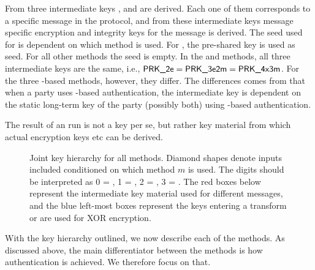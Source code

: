From \mGxy{} three intermediate keys \mPRKtwo, \mPRKthree{} and
\mPRKthree are derived.
%
Each one of them corresponds to a specific message in the protocol, and from
these intermediate keys message specific encryption and integrity keys for the
message is derived.
%
The seed used for \mPRKtwo{} is dependent on which method is used.
%
For \mPskPsk{}, the pre-shared key is used as seed.
%
For all other methods the seed is empty.
%
In the \mPskPsk{} and \mSigSig{} methods, all three intermediate keys
are the same, i.e., $\text{\textup{\textsf{PRK\_2e}}}{} = \text{\textup{\textsf{PRK\_3e2m}}}{} = \text{\textup{\textsf{PRK\_4x3m}}}$.
%
For the three \mStat-based methods, however, they differ.
%
The differences comes from that when a party uses \mStat{}-based authentication,
the intermediate key \mPRKthree{} is dependent on the static long-term key of
the party (possibly both) using \mStat{}-based authentication.
%

The result of an \mEdhoc{} run is not a key per se, but rather key material from
which actual encryption keys etc can be derived.
%


\begin{figure}[htp]
\centering
\scalebox{.75}{

}
\caption{Joint key hierarchy for all methods. Diamond shapes denote inputs
included conditioned on which method $m$ is used. The digits should be
interpreted as 0 = \mSigSig, 1 = \mSigStat, 2 = \mStatSig, 3 = \mStatStat.
The red boxes below \mGxy{} represent the intermediate key material used for
different messages, and the blue left-most boxes represent the keys entering
a \mAead{} transform or are used for XOR encryption.}
\label{fig:kdfdiagram}
\end{figure}

With the key hierarchy outlined, we now describe each of the \mEdhoc{} methods.
%
As discussed above, the main differentiator between the methods is how
authentication is achieved.
%
We therefore focus on that.
%

